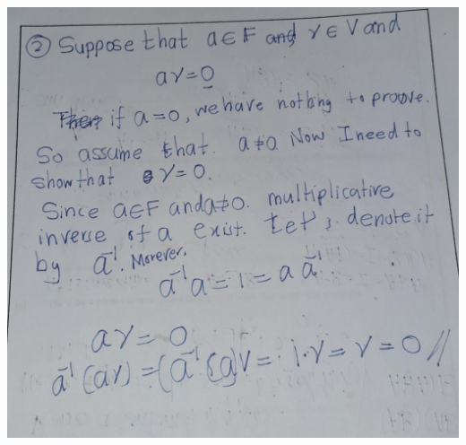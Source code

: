 \documentclass[
]{book}
\theoremstyle{definition}
\theoremstyle{definition}
\theoremstyle{definition}
\theoremstyle{definition}
\theoremstyle{remark}
\begin{document}
\includegraphics{fig/Ex1B/Ex2.jpg}
\end{document}
